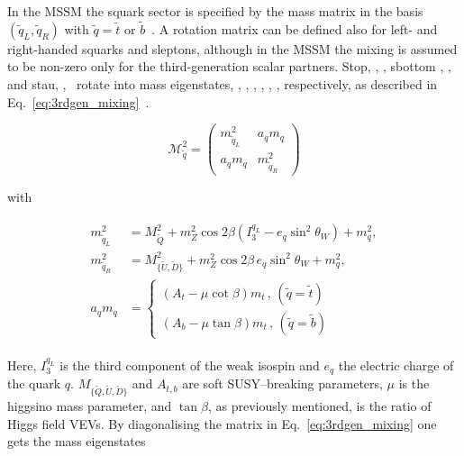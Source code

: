 				In the MSSM the squark sector is specified by the mass matrix in the basis $(\tilde{q}_L, \tilde{q}_R)$ with $\tilde{q} = \tilde{t}$ or $\tilde{b}$~\cite{Haber:1984rc}. A rotation matrix can be defined also for left- and right-handed squarks and sleptons, although in the MSSM the mixing is assumed to be non-zero only for the third-generation scalar partners. Stop, \stopL, \stopR, sbottom \sbottomL, \sbottomR, and stau, \stauL, \stauR\ rotate into mass eigenstates, \stopone, \stoptwo, \sbottomone, \sbottomtwo, \stauone, \stautwo, respectively, as described in Eq.~\ref{eq:3rdgen_mixing}~\cite{Hidaka:2000cm}. %

				\begin{equation}
				\label{eq:3rdgen_mixing}
					\mathcal {M}_{\tilde{q}}^2 = 
					\begin{pmatrix}
						m_{\tilde{q}_L}^2 & a_q m_q \\
						a_q m_q & m_{\tilde{q}_R}^2
					\end{pmatrix}
				\end{equation}

				\noindent with 

				\begin{align}
				\label{eq:msqL}
					\begin{split}
						m_{\tilde{q}_L}^2 & = M_{\tilde{Q}}^2 + m_Z^2 \cos 2\beta \left ( I_3^{q_L} - e_q \sin^2 \theta_W \right ) + m_q^2 ,
						\\ 
						m_{\tilde{q}_R}^2 & = M_{{\{ \tilde{U},\tilde{D} \}}}^2 + m_Z^2 \cos 2\beta\, e_q \sin^2 \theta_W  + m_q^2 , 
						\\
						a_q m_q & = 
						\begin{cases}
							\left ( A_t - \mu \cot \beta \right ) m_t\, , \, (\tilde{q} = \tilde{t}) \\  
							\left ( A_b - \mu \tan \beta \right ) m_t\, , \, (\tilde{q} = \tilde{b})  
						\end{cases}
					\end{split}
				\end{align}

				\noindent Here, $I_3^{q_L}$ is the third component of the weak isospin and $e_q$ the electric charge of the quark $q$. $M_{{\{ \tilde{Q},\tilde{U},\tilde{D} \}}}$ and $A_{t,b}$ are soft SUSY–breaking parameters, $\mu$ is the higgsino mass parameter, and $\tan \beta$, as previously mentioned, is the ratio of Higgs field VEVs. By diagonalising the matrix in Eq.~\ref{eq:3rdgen_mixing} one gets the mass eigenstates 
				
